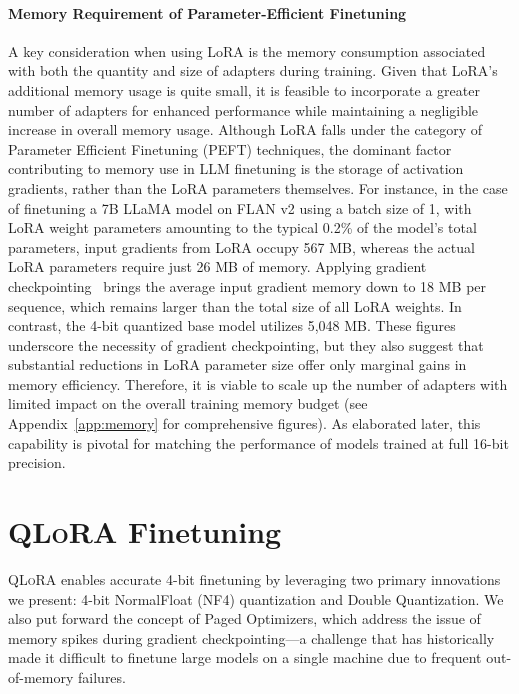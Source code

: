 \paragraph{Memory Requirement of Parameter-Efficient Finetuning} A key consideration when using LoRA is the memory consumption associated with both the quantity and size of adapters during training. Given that LoRA's additional memory usage is quite small, it is feasible to incorporate a greater number of adapters for enhanced performance while maintaining a negligible increase in overall memory usage. Although LoRA falls under the category of Parameter Efficient Finetuning (PEFT) techniques, the dominant factor contributing to memory use in LLM finetuning is the storage of activation gradients, rather than the LoRA parameters themselves. For instance, in the case of finetuning a 7B LLaMA model on FLAN v2 using a batch size of 1, with LoRA weight parameters amounting to the typical 0.2\% of the model's total parameters\citep{hu2021lora,liu2022few}, input gradients from LoRA occupy 567 MB, whereas the actual LoRA parameters require just 26 MB of memory. Applying gradient checkpointing~\citep{chen2016training} brings the average input gradient memory down to 18 MB per sequence, which remains larger than the total size of all LoRA weights. In contrast, the 4-bit quantized base model utilizes 5,048 MB. These figures underscore the necessity of gradient checkpointing, but they also suggest that substantial reductions in LoRA parameter size offer only marginal gains in memory efficiency. Therefore, it is viable to scale up the number of adapters with limited impact on the overall training memory budget (see Appendix~\ref{app:memory} for comprehensive figures). As elaborated later, this capability is pivotal for matching the performance of models trained at full 16-bit precision.

\section{\textsc{QLoRA} Finetuning}

\textsc{QLoRA} enables accurate 4-bit finetuning by leveraging two primary innovations we present: 4-bit NormalFloat (NF4) quantization and Double Quantization. We also put forward the concept of Paged Optimizers, which address the issue of memory spikes during gradient checkpointing—a challenge that has historically made it difficult to finetune large models on a single machine due to frequent out-of-memory failures.

